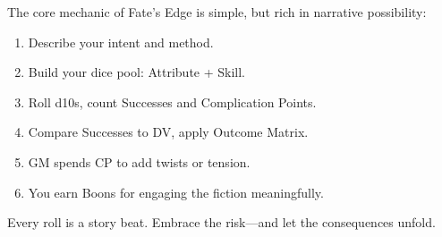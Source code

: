 The core mechanic of Fate’s Edge is simple, but rich in narrative possibility:

\begin{enumerate}
  \item Describe your intent and method.
  \item Build your dice pool: Attribute + Skill.
  \item Roll d10s, count Successes and Complication Points.
  \item Compare Successes to DV, apply Outcome Matrix.
  \item GM spends CP to add twists or tension.
  \item You earn Boons for engaging the fiction meaningfully.
\end{enumerate}

Every roll is a story beat. Embrace the risk—and let the consequences unfold.


